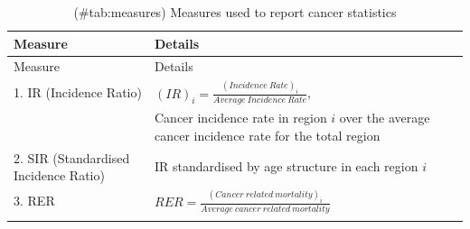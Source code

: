 \documentclass[11pt,]{article}
\begin{document}
\begin{longtable}[]{@{}ll@{}}
\caption{(\#tab:measures) Measures used to report cancer
statistics}\tabularnewline
\toprule
\begin{minipage}[b]{0.28\columnwidth}\raggedright
Measure\strut
\end{minipage} & \begin{minipage}[b]{0.66\columnwidth}\raggedright
Details\strut
\end{minipage}\tabularnewline
\midrule
\endfirsthead
\toprule
\begin{minipage}[b]{0.28\columnwidth}\raggedright
Measure\strut
\end{minipage} & \begin{minipage}[b]{0.66\columnwidth}\raggedright
Details\strut
\end{minipage}\tabularnewline
\midrule
\endhead
\begin{minipage}[t]{0.28\columnwidth}\raggedright
1. IR (Incidence Ratio)\strut
\end{minipage} & \begin{minipage}[t]{0.66\columnwidth}\raggedright
\((IR)_i=\frac{(Incidence\ Rate)_i}{Average\ Incidence\ Rate}\),\strut
\end{minipage}\tabularnewline
\begin{minipage}[t]{0.28\columnwidth}\raggedright
\strut
\end{minipage} & \begin{minipage}[t]{0.66\columnwidth}\raggedright
Cancer incidence rate in region \(i\) over the average cancer incidence
rate for the total region\strut
\end{minipage}\tabularnewline
\begin{minipage}[t]{0.28\columnwidth}\raggedright
2. SIR (Standardised Incidence Ratio)\strut
\end{minipage} & \begin{minipage}[t]{0.66\columnwidth}\raggedright
IR standardised by age structure in each region \(i\)\strut
\end{minipage}\tabularnewline
\begin{minipage}[t]{0.28\columnwidth}\raggedright
3. RER\strut
\end{minipage} & \begin{minipage}[t]{0.66\columnwidth}\raggedright
\(RER = \frac{(Cancer\ related\ mortality)_i}{Average\ cancer\ related\ mortality}\)\strut
\end{minipage}\tabularnewline
\begin{minipage}[t]{0.28\columnwidth}\raggedright

\end{minipage}
\end{longtable}
\end{document}
